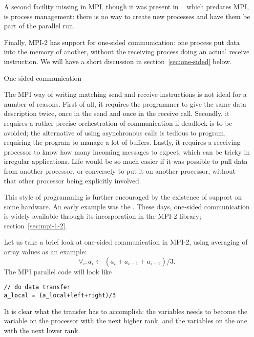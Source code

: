 A second facility missing in MPI, though it was present in
~\cite{pvm-1,pvm-2} which predates MPI, is process
management: there is no way to create new processes and have them be
part of the parallel run.

Finally, MPI-2 has support for one-sided communication: one process
put data into the memory of another, without the receiving process
doing an actual receive instruction. We will have a short discussion
in section~\ref{sec:one-sided} below.


 {One-sided communication}
\label{sec:one-sided}

The MPI way of writing matching send and receive instructions is not
ideal for a number of reasons. First of all, it requires the
programmer to give the same data description twice, once in the send
and once in the receive call. Secondly, it requires a rather precise
orchestration of communication if deadlock is to be avoided; the
alternative of using asynchronous calls is tedious to program,
requiring the program to manage a lot of buffers.
Lastly, it requires a receiving processor to know how many incoming
messages to expect, which can be tricky in irregular applications.
Life would be so much easier if it was
possible to pull data from another processor, or conversely to put it
on another processor, without that other processor being explicitly
involved. 

This style of programming is further encouraged by the
existence of  support on some hardware. An early example was
the  . 
These days, one-sided communication is widely available through its
incorporation in the MPI-2 library; section~\ref{sec:mpi-1-2}.

Let us take a brief look at one-sided communication in MPI-2, using
averaging of array values as an example:
\[ \forall_i\colon a_i\leftarrow (a_i+a_{i-1}+a_{i+1})/3. \]
The MPI parallel code will look like
\begin{verbatim}
// do data transfer
a_local = (a_local+left+right)/3
\end{verbatim}
It is clear what the transfer has to accomplish: the 
variables needs to become the  variable on the processor with
the next higher rank, and the  variables on the one with the
next lower rank.

